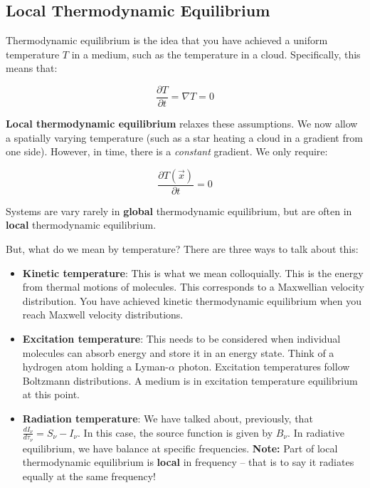 \documentclass{article}
\begin{document}
\subsection{Local Thermodynamic Equilibrium}

Thermodynamic equilibrium is the idea that you have achieved a uniform temperature $T$ in a medium, such as the temperature in a cloud. Specifically, this means that:

\begin{equation}
    \frac{\partial T}{\partial t} = \nabla T = 0
\end{equation}

\textbf{Local thermodynamic equilibrium} relaxes these assumptions. We now allow a spatially varying temperature (such as a star heating a cloud in a gradient from one side). However, in time, there is a \textit{constant} gradient. We only require:

\begin{equation}
    \frac{\partial T(\vec{x})}{\partial t} = 0
\end{equation}

Systems are vary rarely in \textbf{global} thermodynamic equilibrium, but are often in \textbf{local} thermodynamic equilibrium.

But, what do we mean by temperature? There are three ways to talk about this: 

\begin{itemize}
    \item \textbf{Kinetic temperature}: This is what we mean colloquially. This is the energy from thermal motions of molecules. This corresponds to a Maxwellian velocity distribution. You have achieved kinetic thermodynamic equilibrium when you reach Maxwell velocity distributions.
    
    \item  \textbf{Excitation temperature}: This needs to be considered when individual molecules can absorb energy and store it in an energy state. Think of a hydrogen atom holding a Lyman-$\alpha$ photon. Excitation temperatures follow Boltzmann distributions. A medium is in excitation temperature equilibrium at this point.
    
    \item \textbf{Radiation temperature}: We have talked about, previously, that $\frac{d I_\nu}{d \tau_\nu} = S_\nu - I_\nu$. In this case, the source function is given by $B_\nu$. In radiative equilibrium, we have balance at specific frequencies. \textbf{Note:} Part of local thermodynamic equilibrium is \textbf{local} in frequency -- that is to say it radiates equally at the same frequency!
\end{itemize}
\end{document}
